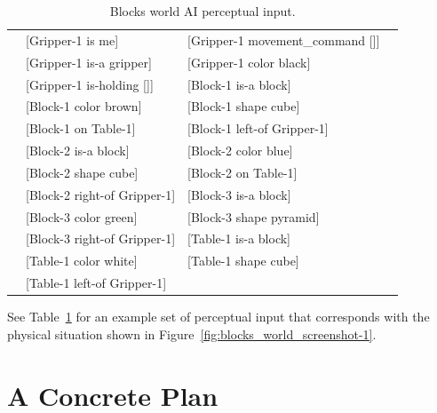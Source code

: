 \begin{table}
  \myfloatalign
  \begin{tabularx}{\textwidth}{XllX}
    & [Gripper-1 is me] & [Gripper-1 movement\_command []] & \\
    & [Gripper-1 is-a gripper] & [Gripper-1 color black] & \\
    & [Gripper-1 is-holding []] & [Block-1 is-a block] & \\
    & [Block-1 color brown] & [Block-1 shape cube] & \\
    & [Block-1 on Table-1] & [Block-1 left-of Gripper-1] & \\
    & [Block-2 is-a block] & [Block-2 color blue] & \\
    & [Block-2 shape cube] & [Block-2 on Table-1] & \\
    & [Block-2 right-of Gripper-1] & [Block-3 is-a block] & \\
    & [Block-3 color green] & [Block-3 shape pyramid] & \\
    & [Block-3 right-of Gripper-1] & [Table-1 is-a block] & \\
    & [Table-1 color white] & [Table-1 shape cube] & \\
    & [Table-1 left-of Gripper-1] & &
  \end{tabularx}
  \caption[Blocks world AI perceptual input]{Blocks world AI perceptual input.}
  \label{tab:blocks_world_agent_perceptions}
\end{table}

See Table~\ref{tab:blocks_world_agent_perceptions} for an example set of perceptual input that corresponds with the physical situation shown in Figure~\ref{fig:blocks_world_screenshot-1}.

\section{A Concrete Plan}


%
%
%
%
%
%
%
%
%
%
%
%

